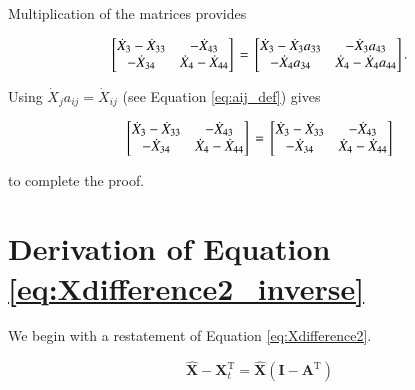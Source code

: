 \documentclass[authoryear,preprint,review,12pt]{elsarticle}
\let\oldhat\hat
\renewcommand{\vec}[1]{\mathbf{#1}}
\renewcommand{\hat}[1]{\oldhat{\mathbf{#1}}}
\begin{document}
\noindent Multiplication of the matrices provides

\begin{equation} \label{eq:Xdifference2Proof-3}
\begin{bmatrix} 	\dot{X}_{3} - \dot{X}_{33} & - \dot{X}_{43}	\\
				- \dot{X}_{34} & \dot{X}_{4} - \dot{X}_{44}	\\
\end{bmatrix} \\
= \\
\begin{bmatrix} 	\dot{X}_{3} - \dot{X}_3 a_{33} & - \dot{X}_3 a_{43}	\\
				- \dot{X}_4 a_{34} & \dot{X}_{4} - \dot{X}_4 a_{44}	\\
\end{bmatrix}.
\end{equation}

\noindent Using $\dot{X}_j a_{ij} = \dot{X}_{ij}$ (see Equation \ref{eq:aij_def}) gives

\begin{equation} \label{eq:Xdifference2Proof-4}
\begin{bmatrix} 	\dot{X}_{3} - \dot{X}_{33} & - \dot{X}_{43}	\\
				- \dot{X}_{34} & \dot{X}_{4} - \dot{X}_{44}	\\
\end{bmatrix} \\
= \\
\begin{bmatrix} 	\dot{X}_{3} - \dot{X}_{33} & - \dot{X}_{43}	\\
				- \dot{X}_{34} & \dot{X}_{4} - \dot{X}_{44}	\\
\end{bmatrix}
\end{equation}

\noindent to complete the proof.

\section{Derivation of Equation \ref{eq:Xdifference2_inverse}}

We begin with a restatement of Equation \ref{eq:Xdifference2}.

\begin{equation} \label{eq:Xdifference2_inverse_Proof-1}
	\hat{\vec{X}} - \vec{X}_t^\mathrm{T} = \hat{\vec{X}}(\vec{I} - \vec{A}^\mathrm{T})
\end{equation}
\end{document}
